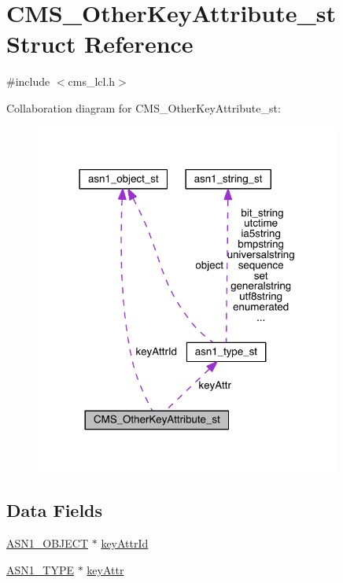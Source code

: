 \hypertarget{struct_c_m_s___other_key_attribute__st}{}\section{C\+M\+S\+\_\+\+Other\+Key\+Attribute\+\_\+st Struct Reference}
\label{struct_c_m_s___other_key_attribute__st}


{\ttfamily \#include $<$cms\+\_\+lcl.\+h$>$}



Collaboration diagram for C\+M\+S\+\_\+\+Other\+Key\+Attribute\+\_\+st\+:\nopagebreak
\begin{figure}[H]
\begin{center}
\leavevmode
\includegraphics[width=285pt]{struct_c_m_s___other_key_attribute__st__coll__graph}
\end{center}
\end{figure}
\subsection*{Data Fields}
\begin{DoxyCompactItemize}
\item 
\hyperlink{crypto_2ossl__typ_8h_ae3fda0801e4c8e250087052bafb3ce2e}{A\+S\+N1\+\_\+\+O\+B\+J\+E\+CT} $\ast$ \hyperlink{struct_c_m_s___other_key_attribute__st_ad30ddc6c7aac9445327418a36ac4bd97}{key\+Attr\+Id}
\item 
\hyperlink{crypto_2asn1_2asn1_8h_a7895e03d9fee2bc4963faf2a31a9439e}{A\+S\+N1\+\_\+\+T\+Y\+PE} $\ast$ \hyperlink{struct_c_m_s___other_key_attribute__st_a0dc51f837d35bcd9b61a183ef263427c}{key\+Attr}
\end{DoxyCompactItemize}


